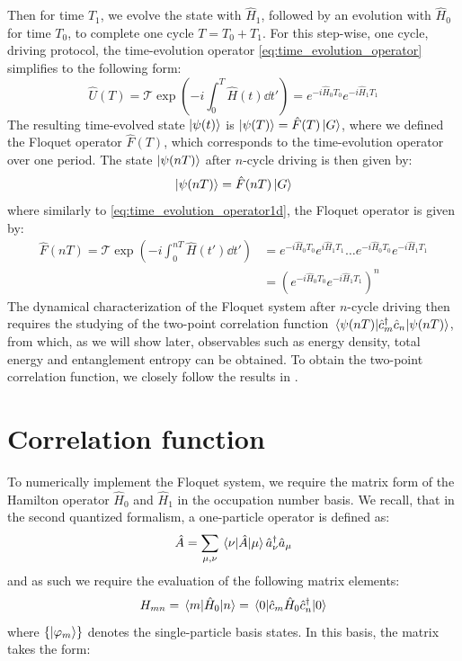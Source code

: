 \documentclass[11pt, a4paper, oneside]{book}
\theoremstyle{definition} %
\begin{document}
 Then for time $T_1$, we evolve the state with $\hat{H}_1$, followed by an evolution with $\hat{H}_0$ for time $T_0$, to complete one cycle $T = T_0 + T_1$. For this step-wise, one cycle, driving protocol, the time-evolution operator \ref{eq:time_evolution_operator} simplifies to the following form: 
\begin{equation}
	\hat{U}(T) = \mathcal{T}\exp(-i \int_{0}^T \hat{H}(t) \dd t') = e^{-i \hat{H}_0 T_0} e^{-i \hat{H}_1 T_1}
	\label{eq:time_evolution_operator1d}
\end{equation}
The resulting time-evolved state $\ket{\psi(t)}$ is $\ket{\psi(T)} = \hat{F}(T) \ket{G}$, where we defined the Floquet operator $\hat{F}(T)$, which corresponds to the time-evolution operator over one period. The state $\ket{\psi(nT)}$ after $n$-cycle driving is then given by:
\begin{equation}
	\ket{\psi(nT)} = \hat{F}(nT) \ket{G}
\end{equation}
where similarly to \ref{eq:time_evolution_operator1d}, the Floquet operator is given by:
\begin{equation}
\begin{split}
		\hat{F}(nT) = \mathcal{T} \exp(-i \int_{0}^{nT} \hat{H}(t') \dd t') &= e^{-i \hat{H}_0 T_0}e^{i \hat{H}_1 T_1}\dots e^{-i \hat{H}_0 T_0} e^{-i\hat{H}_1 T_1} \\
		&= \left( e^{-i \hat{H}_0 T_0} e^{-i \hat{H}_1 T_1} \right)^n
\end{split}
\label{eq:Floquet_operator_n_cycles}
\end{equation}
The dynamical characterization of the Floquet system after $n$-cycle driving then requires the studying of the two-point correlation function $\mel{\psi(nT)}{\hat{c}_m^\dagger \hat{c}_n}{\psi(nT)}$, from which, as we will show later, observables such as energy density, total energy and entanglement entropy can be obtained. To obtain the two-point correlation function, we closely follow the results in \cite{Xueda}.

\section{Correlation function}
\label{sec:correlation_function_1d}

To numerically implement the Floquet system, we require the matrix form of the Hamilton operator $\hat{H}_0$ and $\hat{H}_1$ in the occupation number basis. We recall, that in the second quantized formalism, a one-particle operator is defined as:
	\begin{equation}
		\hat{A} = \sum_{\mu, \nu} \mel{\nu}{\hat{A}}{\mu} \hat{a}_\nu^\dagger \hat{a}_\mu
	\end{equation}
	and as such we require the evaluation of the following matrix elements:
	\begin{equation}
		H_{mn} = \mel{m}{\hat{H}_0}{n} = \mel{0}{\hat{c}_m\hat{H}_0 \hat{c}_n^\dagger}{0}
		\label{eq:Matrixelements}
	\end{equation}
	where $\{\ket{\varphi_m}\}$ denotes the single-particle basis states. In this basis, the matrix takes the form:
\end{document}
